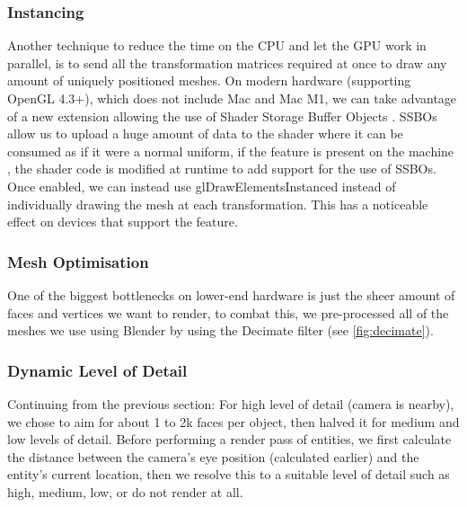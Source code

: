 \documentclass{article}
\begin{document}
\begin{multicols}{2}
                \subsubsection{Instancing}

                    Another technique to reduce the time on the CPU and let the GPU work in parallel, is to send all the transformation matrices required at once to draw any amount of uniquely positioned meshes. On modern hardware (supporting OpenGL 4.3+), which does not include Mac and Mac M1, we can take advantage of a new extension allowing the use of Shader Storage Buffer Objects \cite{ssbo}. SSBOs allow us to upload a huge amount of data to the shader where it can be consumed as if it were a normal uniform, if the feature is present on the machine \cite{extension-list}, the shader code is modified at runtime to add support for the use of SSBOs. Once enabled, we can instead use glDrawElementsInstanced instead of individually drawing the mesh at each transformation. This has a noticeable effect on devices that support the feature.

                \subsubsection{Mesh Optimisation}

                    One of the biggest bottlenecks on lower-end hardware is just the sheer amount of faces and vertices we want to render, to combat this, we pre-processed all of the meshes we use using Blender by using the Decimate filter (see \autoref{fig:decimate}).

                \subsubsection{Dynamic Level of Detail}

                    Continuing from the previous section: For high level of detail (camera is nearby), we chose to aim for about 1 to 2k faces per object, then halved it for medium and low levels of detail. Before performing a render pass of entities, we first calculate the distance between the camera’s eye position (calculated earlier) and the entity’s current location, then we resolve this to a suitable level of detail such as high, medium, low, or do not render at all.



    \end{multicols}
\end{document}
